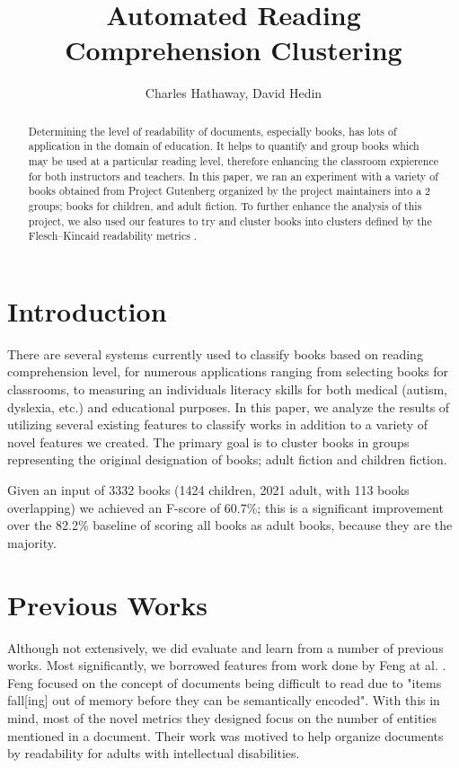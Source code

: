 \documentclass[]{article}
\title{Automated Reading Comprehension Clustering}
\author{Charles Hathaway, David Hedin}
\begin{document}
\maketitle

\begin{abstract}

Determining the level of readability of documents, especially books, has lots of application in the domain of education.
It helps to quantify and group books which may be used at a particular reading level, therefore enhancing the classroom expierence for both instructors and teachers.
In this paper, we ran an experiment with a variety of books obtained from Project Gutenberg \cite{gutenberg2015} organized by the project maintainers into a 2 groups; books for children, and adult fiction.
To further enhance the analysis of this project, we also used our features to try and cluster books into clusters defined by the Flesch–Kincaid readability metrics \cite{kincaid1975derivation}.

\end{abstract}

\section{Introduction}

There are several systems currently used to classify books based on reading comprehension level, for numerous applications ranging from selecting books for classrooms, to measuring an individuals literacy skills for both medical (autism, dyslexia, etc.) and educational purposes.
In this paper, we analyze the results of utilizing several existing features to classify works in addition to a variety of novel features we created.
The primary goal is to cluster books in groups representing the original designation of books; adult fiction and children fiction.

Given an input of 3332 books (1424 children, 2021 adult, with 113 books overlapping) we achieved an F-score of 60.7\%; this is a significant improvement over the 82.2\% baseline of scoring all books as adult books, because they are the majority.

\section{Previous Works}

Although not extensively, we did evaluate and learn from a number of previous works.
Most significantly, we borrowed features from work done by Feng at al. \cite{feng2009cognitively}.
Feng focused on the concept of documents being difficult to read due to "items fall[ing] out of memory before they can be semantically encoded".
With this in mind, most of the novel metrics they designed focus on the number of entities mentioned in a document.
Their work was motived to help organize documents by readability for adults with intellectual disabilities.
\end{document}
